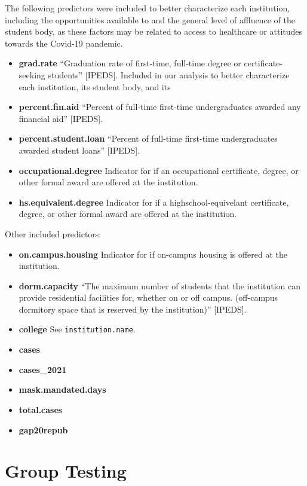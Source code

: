 \documentclass[
]{article}
\begin{document}
The following predictors were included to better characterize each
institution, including the opportunities available to and the general
level of affluence of the student body, as these factors may be related
to access to healthcare or attitudes towards the Covid-19 pandemic.

\begin{itemize}
\item
  \textbf{grad.rate} ``Graduation rate of first-time, full-time degree
  or certificate-seeking students'' {[}IPEDS{]}. Included in our
  analysis to better characterize each institution, its student body,
  and its
\item
  \textbf{percent.fin.aid} ``Percent of full-time first-time
  undergraduates awarded any financial aid'' {[}IPEDS{]}.
\item
  \textbf{percent.student.loan} ``Percent of full-time first-time
  undergraduates awarded student loans'' {[}IPEDS{]}.
\item
  \textbf{occupational.degree} Indicator for if an occupational
  certificate, degree, or other formal award are offered at the
  institution.
\item
  \textbf{hs.equivalent.degree} Indicator for if a highschool-equivelant
  certificate, degree, or other formal award are offered at the
  institution.
\end{itemize}

Other included predictors:

\begin{itemize}
\item
  \textbf{on.campus.housing} Indicator for if on-campus housing is
  offered at the institution.
\item
  \textbf{dorm.capacity} ``The maximum number of students that the
  institution can provide residential facilities for, whether on or off
  campus. (off-campus dormitory space that is reserved by the
  institution)'' {[}IPEDS{]}.
\item
  \textbf{college} See \texttt{institution.name}.
\item
  \textbf{cases}
\item
  \textbf{cases\_2021}
\item
  \textbf{mask.mandated.days}
\item
  \textbf{total.cases}
\item
  \textbf{gap20repub}
\end{itemize}

\hypertarget{group-testing}{%
\section{Group Testing}\label{group-testing}}
\end{document}
